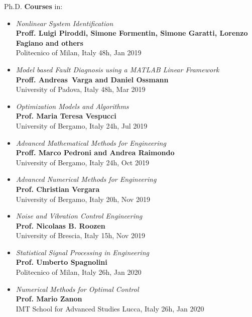 \documentclass[10pt]{article}
\begin{document}
Ph.D. \textbf{Courses} in:
\begin{itemize}	
	\setlength\itemsep{-3pt}
	\renewcommand\labelitemi{$\vcenter{\hbox{\tiny$\bullet$}}$}
	\item \textit{Nonlinear System Identification}\\
	\textbf{Proff. Luigi Piroddi, Simone Formentin, Simone Garatti, Lorenzo Fagiano and others}\\
	Politecnico of Milan, Italy \hfill 48h, Jan 2019\\
	\item \textit{Model based Fault Diagnosis using a MATLAB Linear Framework}\\
	\textbf{Proff. Andreas Varga and Daniel Ossmann}\\
	University of Padova, Italy \hfill 48h, Mar 2019\\
	\item \textit{Optimization Models and Algorithms}\\
	\textbf{Prof. Maria Teresa Vespucci}\\
	University of Bergamo, Italy \hfill 24h, Jul 2019\\
	\item \textit{Advanced Mathematical Methods for Engineering}\\
	\textbf{Proff. Marco Pedroni and Andrea Raimondo}\\
	University of Bergamo, Italy \hfill 24h, Oct 2019\\
	\item \textit{Advanced Numerical Methods for Engineering}\\
	\textbf{Prof. Christian Vergara}\\
	University of Bergamo, Italy \hfill 20h, Nov 2019\\
	\item \textit{Noise and Vibration Control Engineering}\\
	\textbf{Prof. Nicolaas B. Roozen}\\
	University of Brescia, Italy \hfill 15h, Nov 2019\\
	\item \textit{Statistical Signal Processing in Engineering}\\
	\textbf{Prof. Umberto Spagnolini}\\
	Politecnico of Milan, Italy \hfill 26h, Jan 2020\\
	\item \textit{Numerical Methods for Optimal Control}\\
	\textbf{Prof. Mario Zanon}\\
	IMT School for Advanced Studies Lucca, Italy \hfill 26h, Jan 2020\\
	
\end{itemize}
\end{document}
